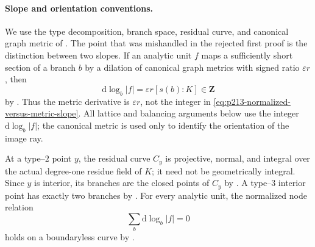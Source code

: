 
\paragraph{Slope and orientation conventions.}
We use the type decomposition, branch space, residual curve, and canonical
graph metric of \cite[\S\S3.3--4.5]{Ducros24CurveStructure}.  The point
that was mishandled in the rejected first proof is the distinction between
two slopes.  If an analytic unit $f$ maps a sufficiently short section of
a branch $b$ by a dilation of canonical graph metrics with signed ratio
$\varepsilon r$, then
\begin{equation}
             \mathrm d\log_b|f|
                  =\varepsilon r [s(b):K]\in\mathbf Z
\label{eq:p213-normalized-versus-metric-slope}
\end{equation}
by \cite[\S4.5.21.4]{Ducros24CurveStructure}.  Thus the metric derivative
is $\varepsilon r$, not the integer in
\eqref{eq:p213-normalized-versus-metric-slope}.  All lattice and balancing
arguments below use the integer $\mathrm d\log_b|f|$; the canonical metric
is used only to identify the orientation of the image ray.

At a type--$2$ point $y$, the residual curve $C_y$ is projective, normal,
and integral over the actual degree-one residue field of $K$; it need not
be geometrically integral.  Since $y$ is interior, its branches are the
closed points of $C_y$ by
\cite[Theorem~4.2.10 and \S4.2.11.1]{Ducros24CurveStructure}.  A type--$3$
interior point has exactly two branches by
\cite[\S4.2.11.2]{Ducros24CurveStructure}.  For every analytic unit, the
normalized node relation
\begin{equation}
                    \sum_{b}\mathrm d\log_b|f|=0
\label{eq:p213-normalized-node-relation}
\end{equation}
holds on a boundaryless curve by
\cite[Theorem~4.5.22]{Ducros24CurveStructure}.

